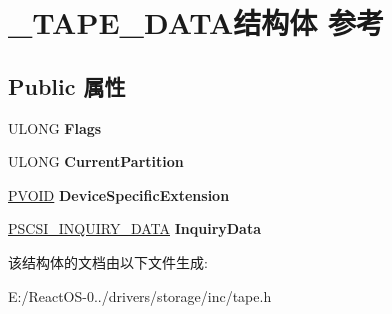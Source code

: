 \hypertarget{struct___t_a_p_e___d_a_t_a}{}\section{\+\_\+\+T\+A\+P\+E\+\_\+\+D\+A\+T\+A结构体 参考}
\label{struct___t_a_p_e___d_a_t_a}
\subsection*{Public 属性}
\begin{DoxyCompactItemize}
\item 
\mbox{\label{struct___t_a_p_e___d_a_t_a_acf13d7598c881c11479cd21709410ff9}} 
U\+L\+O\+NG {\bfseries Flags}
\item 
\mbox{\label{struct___t_a_p_e___d_a_t_a_a2423f07afdc65c1b030edd7febeda3e3}} 
U\+L\+O\+NG {\bfseries Current\+Partition}
\item 
\mbox{\label{struct___t_a_p_e___d_a_t_a_a8a91690223f6634e8c5e43b48feb5570}} 
\hyperlink{interfacevoid}{P\+V\+O\+ID} {\bfseries Device\+Specific\+Extension}
\item 
\mbox{\label{struct___t_a_p_e___d_a_t_a_a83356b9728ef3d0b789dfe4146aab6b4}} 
\hyperlink{struct___s_c_s_i___i_n_q_u_i_r_y___d_a_t_a}{P\+S\+C\+S\+I\+\_\+\+I\+N\+Q\+U\+I\+R\+Y\+\_\+\+D\+A\+TA} {\bfseries Inquiry\+Data}
\end{DoxyCompactItemize}


该结构体的文档由以下文件生成\+:\begin{DoxyCompactItemize}
\item 
E\+:/\+React\+O\+S-\/0../drivers/storage/inc/tape.\+h\end{DoxyCompactItemize}
